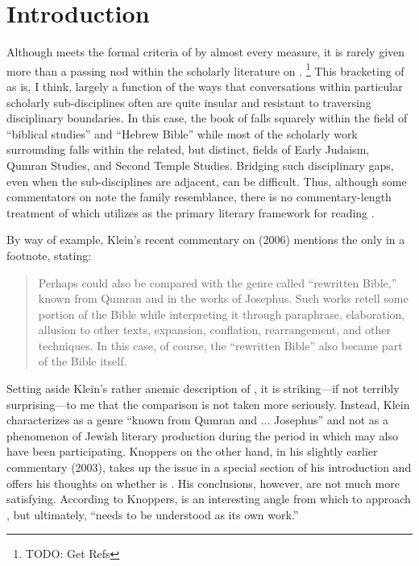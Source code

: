 \section{Introduction}

Although \chronicles meets the formal criteria of \rwb by almost every measure, it is rarely given more than a passing nod within the scholarly literature on \rwb.%
    \footnote{TODO: Get Refs}
This bracketing of \chronicles as \rwb is, I think, largely a function of the ways that conversations within particular scholarly sub-disciplines often are quite insular and resistant to traversing disciplinary boundaries. In this case, the book of \chronicles falls squarely within the field of ``biblical studies'' and ``Hebrew Bible'' while most of the scholarly work surrounding \rwb falls within the related, but distinct, fields of Early Judaism, Qumran Studies, and Second Temple Studies. Bridging such disciplinary gaps, even when the sub-disciplines are adjacent, can be difficult. Thus, although some commentators on \chronicles note the family resemblance, there is no commentary-length treatment of \chronicles which utilizes \rwb as the primary literary framework for reading \chronicles.

By way of example, Klein's recent commentary on \chronicles (2006) mentions the \rwb only in a footnote, stating:

\begin{quote}
    Perhaps \chronicles could also be compared with the genre called ``rewritten Bible,'' known from Qumran and in the works of Josephus. Such works retell some portion of the Bible while interpreting it through paraphrase, elaboration, allusion to other texts, expansion, conflation, rearrangement, and other techniques. In this case, of course, the ``rewritten Bible'' also became part of the Bible itself.\autocite[17 n.157]{klein2006}
\end{quote}

Setting aside Klein's rather anemic description of \rwb, it is striking---if not terribly surprising---to me that the comparison is not taken more seriously. Instead, Klein characterizes \rwb as a genre ``known from Qumran and ... Josephus'' and not as a phenomenon of Jewish literary production during the \secondtemple period in which \chronicles may also have been participating. Knoppers on the other hand, in his slightly earlier commentary (2003), takes up the issue in a special section of his introduction and offers his thoughts on whether \chronicles is \rwb.\autocite[129--134]{knoppers2003} His conclusions, however, are not much more satisfying. According to Knoppers, \rwb is an interesting angle from which to approach \chronicles, but ultimately, ``\chronicles needs to be understood as its own work.''\autocite[134]{knoppers2003} 

